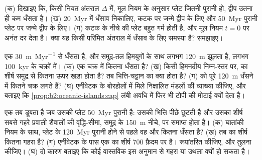 \begin{exercise}[$\star\star\star$]\label{exo:b2:oceanic-islands:10}
(क) दिखाइए कि, किसी नियत अंतराल $\Delta$ में, मूल नियम के अनुसार प्लेट जितनी पुरानी हो, द्वीप उतना ही कम
धँसता है। (ख) \qty{20}{Myr} में धँसाव निकालिए, कटक पर जन्मे द्वीप के लिए और
\qty{50}{Myr} पुरानी प्लेट पर जन्मे द्वीप के लिए। (ग) कटक के नीचे की प्लेट बहुत गर्म होती है, और मूल नियम
$t = 0$ पर अनंत दर देता है। क्या यह किसी परिमित अंतराल में धँसाव के लिए समस्या है? समझाइए।
\end{exercise}

\begin{exercise}[$\star\star\star$]\label{exo:b2:oceanic-islands:11}
एक  \qty{30}{m.Myr^{-1}} से धँसता है, और समुद्र-तल हिमयुगों के साथ लगभग \qty{120}{m}
झूलता है, लगभग \qty{100}{kyr} के चक्रों में। (क) एक चक्र में  कितना धँसता है? (ख) किसी
हिमनदीय निम्न-स्तर पर,  का शीर्ष समुद्र से कितना ऊपर खड़ा होता है? तब भित्ति-चट्टान का क्या होता है?
(ग)  को पूरे \qty{120}{m} धँसने में कितने चक्र लगते हैं?
(घ) एनीवेटक के बोरहोलों में मिले निक्षालित मंडलों की व्याख्या कीजिए, और बताइए कि
\cref{prop:b2:oceanic-islands:cap} लंबी अवधि में फिर भी टोपी की मोटाई क्यों देता है।
\end{exercise}

\begin{exercise}[$\star\star\star$]\label{exo:b2:oceanic-islands:12}
एक  तब डूबता है जब उसकी प्लेट \qty{50}{Myr} पुरानी है: उसकी भित्ति पीछे छूटती है और उसका शीर्ष
सबसे गहरे प्रवाली शैवालों की वृद्धि-सीमा, समुद्र के \qty{150}{m} नीचे, पर समाप्त होता है। (क) घातांकी
नियम के साथ, प्लेट के \qty{120}{Myr} पुरानी होने से पहले वह और कितना धँसता है? (ख) तब  का
शीर्ष कितना गहरा है? (ग) एनीवेटक के पास एक  का शीर्ष 700 फ़ैदम पर है। रूपांतरित कीजिए, और तुलना कीजिए।
(घ) दो कारण बताइए कि कोई वास्तविक  इस अनुमान से गहरा या उथला क्यों हो सकता है।
\end{exercise}

